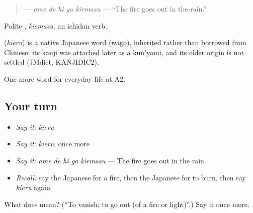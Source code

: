 \begin{quote}
\textbf{  } — \emph{ame de hi ga kiemasu} — \textquotedblleft{}The fire goes out in the rain.\textquotedblright{}
\end{quote}

Polite \textbf{}, \emph{kiemasu}; an ichidan verb.

\begin{cousinweb}
\textbf{} (\emph{kieru}) is a native Japanese word (wago), inherited rather than borrowed from Chinese; its kanji was attached later as a kun'yomi, and its older origin is not settled (JMdict, KANJIDIC2).
\end{cousinweb}

\begin{grammarlens}[title={What you've built}]
One more word for everyday life at A2.
\end{grammarlens}

\subsection*{Your turn}
\begin{itemize}
\raggedright
  \item \emph{Say it:} \emph{kieru}
  \item \emph{Say it:} \emph{kieru}, once more
  \item \emph{Say it:} \emph{ame de hi ga kiemasu} — The fire goes out in the rain.
  \item \emph{Recall:} say the Japanese for a fire, then the Japanese for to burn, then say \emph{kieru} again
\end{itemize}

\begin{tcolorbox}[breakable,colback=teal!4,colframe=teal!35!black,title={Before you move on}]
What does  mean? (\textquotedblleft{}To vanish; to go out (of a fire or light)\textquotedblright{}.) Say it once more.
\end{tcolorbox}
